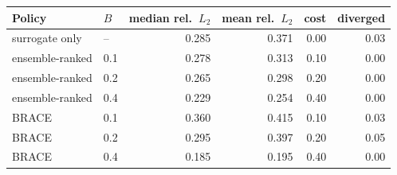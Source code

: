 \begin{tabular}{llrrrr}
\toprule
Policy & $B$ & median rel.\ $L_2$ & mean rel.\ $L_2$ & cost & diverged \\
\midrule
surrogate only & -- & 0.285 & 0.371 & 0.00 & 0.03 \\
ensemble-ranked & 0.1 & 0.278 & 0.313 & 0.10 & 0.00 \\
ensemble-ranked & 0.2 & 0.265 & 0.298 & 0.20 & 0.00 \\
ensemble-ranked & 0.4 & 0.229 & 0.254 & 0.40 & 0.00 \\
BRACE & 0.1 & 0.360 & 0.415 & 0.10 & 0.03 \\
BRACE & 0.2 & 0.295 & 0.397 & 0.20 & 0.05 \\
BRACE & 0.4 & 0.185 & 0.195 & 0.40 & 0.00 \\
\bottomrule
\end{tabular}

